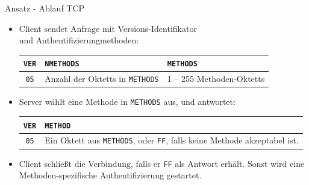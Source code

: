 \documentclass[t]{beamer}
\begin{document}
  \begin{frame}{Ansatz - Ablauf TCP}
    \begin{itemize}
      \item
        Client sendet Anfrage mit Versions-Identifikator \\
        und Authentifizierungmethoden:
        \begin{adjustbox}{max width=\textwidth}

          \begin{tabular}{|c|p{4cm}|p{4cm}|}
            \hline
            \texttt{VER} & \texttt{NMETHODS}                      & \texttt{METHODS} \\
            \hline
            \texttt{05}  & Anzahl der Oktetts in \texttt{METHODS} & 1 – 255 Methoden-Oktetts \\
            \hline
          \end{tabular}
        \end{adjustbox}
      \item
        Server wählt eine Methode in \texttt{METHODS} aus, und antwortet:
        \begin{adjustbox}{max width=\textwidth}
          \begin{tabular}{|c|p{8cm}|}
            \hline
            \texttt{VER} & \texttt{METHOD} \\
            \hline
            \texttt{05}  & Ein Oktett aus \texttt{METHODS}, oder \texttt{FF}, falls keine Methode akzeptabel ist. \\
            \hline
          \end{tabular}
        \end{adjustbox}
      \item
        Client schlie{\ss}t die Verbindung, falls er \texttt{FF} als Antwort erhält.
        Sonst wird eine Methoden-spezifische Authentifizierung gestartet.
    \end{itemize}
  \end{frame}
\end{document}
